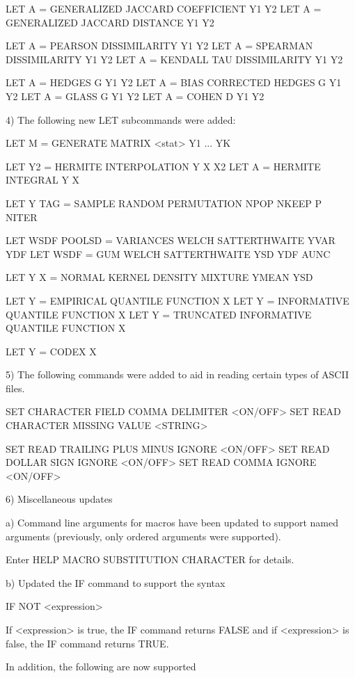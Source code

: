        LET A = GENERALIZED JACCARD COEFFICIENT Y1 Y2
       LET A = GENERALIZED JACCARD DISTANCE Y1 Y2

       LET A = PEARSON DISSIMILARITY Y1 Y2
       LET A = SPEARMAN DISSIMILARITY Y1 Y2
       LET A = KENDALL TAU DISSIMILARITY Y1 Y2

       LET A = HEDGES G Y1 Y2
       LET A = BIAS CORRECTED HEDGES G Y1 Y2
       LET A = GLASS G Y1 Y2
       LET A = COHEN D Y1 Y2

 4) The following new LET subcommands were added:

       LET M = GENERATE MATRIX <stat> Y1 ... YK

       LET Y2 = HERMITE INTERPOLATION Y X X2
       LET A  = HERMITE INTEGRAL Y X

       LET Y TAG = SAMPLE RANDOM PERMUTATION NPOP NKEEP P NITER

       LET WSDF POOLSD = VARIANCES WELCH SATTERTHWAITE YVAR YDF
       LET WSDF        = GUM       WELCH SATTERTHWAITE YSD  YDF  AUNC

       LET Y X = NORMAL KERNEL DENSITY MIXTURE YMEAN YSD

       LET Y = EMPIRICAL QUANTILE FUNCTION X
       LET Y = INFORMATIVE QUANTILE FUNCTION X
       LET Y = TRUNCATED INFORMATIVE QUANTILE FUNCTION X

       LET Y = CODEX X

 5) The following commands were added to aid in reading certain
    types of ASCII files.

        SET CHARACTER FIELD COMMA DELIMITER <ON/OFF>
        SET READ CHARACTER MISSING VALUE <STRING>

        SET READ TRAILING PLUS MINUS IGNORE <ON/OFF>
        SET READ DOLLAR SIGN IGNORE <ON/OFF>
        SET READ COMMA IGNORE <ON/OFF>

 6) Miscellaneous updates

    a) Command line arguments for macros have been updated to support
       named arguments (previously, only ordered arguments were
       supported).

          Enter HELP MACRO SUBSTITUTION CHARACTER for details.

    b) Updated the IF command to support the syntax

          IF NOT <expression>

       If <expression> is true, the IF command returns FALSE and
       if <expression> is false, the IF command returns TRUE.

       In addition, the following are now supported


